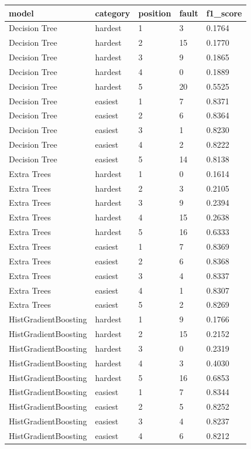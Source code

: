 \begin{tabular}{lllll}
\toprule
model & category & position & fault & f1\_score \\
\midrule
Decision Tree & hardest & 1 & 3 & 0.1764 \\
Decision Tree & hardest & 2 & 15 & 0.1770 \\
Decision Tree & hardest & 3 & 9 & 0.1865 \\
Decision Tree & hardest & 4 & 0 & 0.1889 \\
Decision Tree & hardest & 5 & 20 & 0.5525 \\
Decision Tree & easiest & 1 & 7 & 0.8371 \\
Decision Tree & easiest & 2 & 6 & 0.8364 \\
Decision Tree & easiest & 3 & 1 & 0.8230 \\
Decision Tree & easiest & 4 & 2 & 0.8222 \\
Decision Tree & easiest & 5 & 14 & 0.8138 \\
Extra Trees & hardest & 1 & 0 & 0.1614 \\
Extra Trees & hardest & 2 & 3 & 0.2105 \\
Extra Trees & hardest & 3 & 9 & 0.2394 \\
Extra Trees & hardest & 4 & 15 & 0.2638 \\
Extra Trees & hardest & 5 & 16 & 0.6333 \\
Extra Trees & easiest & 1 & 7 & 0.8369 \\
Extra Trees & easiest & 2 & 6 & 0.8368 \\
Extra Trees & easiest & 3 & 4 & 0.8337 \\
Extra Trees & easiest & 4 & 1 & 0.8307 \\
Extra Trees & easiest & 5 & 2 & 0.8269 \\
HistGradientBoosting & hardest & 1 & 9 & 0.1766 \\
HistGradientBoosting & hardest & 2 & 15 & 0.2152 \\
HistGradientBoosting & hardest & 3 & 0 & 0.2319 \\
HistGradientBoosting & hardest & 4 & 3 & 0.4030 \\
HistGradientBoosting & hardest & 5 & 16 & 0.6853 \\
HistGradientBoosting & easiest & 1 & 7 & 0.8344 \\
HistGradientBoosting & easiest & 2 & 5 & 0.8252 \\
HistGradientBoosting & easiest & 3 & 4 & 0.8237 \\
HistGradientBoosting & easiest & 4 & 6 & 0.8212 \\

\end{tabular}
